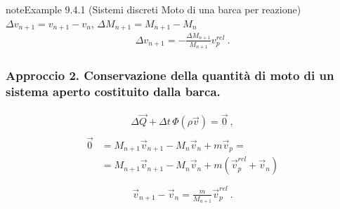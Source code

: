 \documentclass[letterpaper,10pt,italian]{jupyterBook}
\begin{document}
\begin{sphinxadmonition}{note}{Example 9.4.1 (Sistemi discreti \sphinxhyphen{} Moto di una barca per reazione)}
\sphinxAtStartPar
\(\Delta v_{n+1} = v_{n+1} - v_n\), \(\Delta M_{n+1} = M_{n+1} - M_{n}\)
\begin{equation*}
\begin{split}\Delta v_{n+1} = - \frac{\Delta M_{n+1}}{M_{n+1}} v_p^{rel} \ .\end{split}
\end{equation*}\subsubsection*{Approccio 2. Conservazione della quantità di moto di un sistema aperto costituito dalla barca.}
\begin{equation*}
\begin{split}\Delta \vec{Q} + \Delta t \, \Phi(\rho \vec{v}) = \vec{0} \ ,\end{split}
\end{equation*}\begin{equation*}
\begin{split}\begin{aligned}
  \vec{0} & = M_{n+1} \vec{v}_{n+1} - M_{n} \vec{v}_n + m \vec{v}_p =  \\
          & = M_{n+1} \vec{v}_{n+1} - M_{n} \vec{v}_n + m ( \vec{v}_p^{rel} + \vec{v}_n )  \\
\end{aligned}\end{split}
\end{equation*}\begin{equation*}
\begin{split}\vec{v}_{n+1} - \vec{v}_n = \frac{m}{M_{n+1}} \vec{v}_p^{rel} \ .\end{split}
\end{equation*}\end{sphinxadmonition}
\label{ch/mechanics/dynamics-eom-open:example-1}
\end{document}
